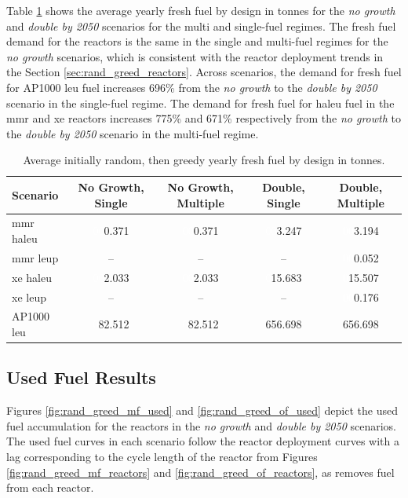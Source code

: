 Table \ref{tab:rand_greed_fresh_avg} shows the average yearly fresh fuel by design in tonnes for the \textit{no growth} and \textit{double by 2050} scenarios for the multi and single-fuel regimes. The fresh fuel demand for the reactors is the same in the single and multi-fuel regimes for the \textit{no growth} scenarios, which is consistent with the reactor deployment trends in the Section \ref{sec:rand_greed_reactors}. Across scenarios, the demand for fresh fuel for AP1000 \gls{leu} fuel increases 696\% from the \textit{no growth} to the \textit{double by 2050} scenario in the single-fuel regime. The demand for fresh fuel for \gls{haleu} fuel in the \gls{mmr} and \gls{xe} reactors increases 775\% and 671\% respectively from the \textit{no growth} to the \textit{double by 2050} scenario in the multi-fuel regime.

\begin{table}[H]
    \centering
    \caption{Average initially random, then greedy yearly fresh fuel by design in tonnes.}
    \label{tab:rand_greed_fresh_avg}
    \begin{tabular}{l c c c c}
       \hline
       Scenario & No Growth, Single & No Growth, Multiple & Double, Single & Double, Multiple  \\
       \hline
       \gls{mmr} \gls{haleu}   & \textcolor{white}{00}0.371    & \textcolor{white}{00}0.371   & \textcolor{white}{00}3.247    & \textcolor{white}{00}3.194    \\
       \gls{mmr} \gls{leup}    & --       & --      & --       & \textcolor{white}{00}0.052    \\
       \gls{xe} \gls{haleu}    & \textcolor{white}{00}2.033    & \textcolor{white}{00}2.033   & \textcolor{white}{0}15.683   & \textcolor{white}{0}15.507   \\
       \gls{xe} \gls{leup}     & --       & --      & --       & \textcolor{white}{00}0.176    \\
       AP1000 \gls{leu}        & \textcolor{white}{0}82.512   & \textcolor{white}{0}82.512  & 656.698  & 656.698  \\
       \hline
    \end{tabular}
\end{table}


\subsection{Used Fuel Results}
\label{sec:rand_greed_used}

Figures \ref{fig:rand_greed_mf_used} and \ref{fig:rand_greed_of_used} depict the used fuel accumulation for the reactors in the \textit{no growth} and \textit{double by 2050} scenarios. The used fuel curves in each scenario follow the reactor deployment curves with a lag corresponding to the cycle length of the reactor from Figures \ref{fig:rand_greed_mf_reactors} and \ref{fig:rand_greed_of_reactors}, as \cyclus removes fuel from each reactor.


